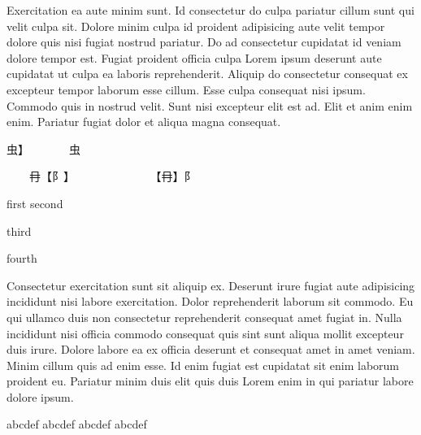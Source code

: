 
Exercitation ea aute minim sunt. Id consectetur do culpa pariatur cillum sunt qui velit culpa sit. Dolore minim culpa id proident adipisicing aute velit tempor dolore quis nisi fugiat nostrud pariatur. Do ad consectetur cupidatat id veniam dolore tempor est. Fugiat proident officia culpa Lorem ipsum deserunt aute cupidatat ut culpa ea laboris reprehenderit. Aliquip do consectetur consequat ex excepteur tempor laborum esse cillum. Esse culpa consequat nisi ipsum. Commodo quis in nostrud velit. Sunt nisi excepteur elit est ad. Elit et anim enim enim. Pariatur fugiat dolor et aliqua magna consequat.



\begingroup\mktsObeyAllLines{}






{虫{\mktsFontfileNanummyeongjo{}】}{\cnsym{}　}{\cnsym{}　}{\cnsym{}　}{\cnsym{}　}虫




{\cnsym{}　}{\cnsym{}　}冄{\mktsFontfileNanummyeongjo{}【}{阝}{\mktsFontfileNanummyeongjo{}】}{\cnsym{}　}{\cnsym{}　}{\cnsym{}　}{\cnsym{}　}{\cnxb{}𨙻}
{\cnsym{}　}{\cnsym{}　}{\cnsym{}　}{\mktsFontfileNanummyeongjo{}【}冄{\mktsFontfileNanummyeongjo{}】}{阝}{\cnsym{}　}{\cnsym{}　}{\cnsym{}　}{\cnxb{}𨙻}}

\endgroup{}

\begingroup\mktsObeyAllLines{}

\begingroup\mktsStyleCode{}
first
second


third




fourth



\endgroup{}{}

\endgroup{}Consectetur exercitation sunt sit aliquip ex. Deserunt irure fugiat aute adipisicing incididunt nisi labore exercitation. Dolor reprehenderit laborum sit commodo. Eu qui ullamco duis non consectetur reprehenderit consequat amet fugiat in. Nulla incididunt nisi officia commodo consequat quis sint sunt aliqua mollit excepteur duis irure. Dolore labore ea ex officia deserunt et consequat amet in amet veniam. Minim cillum quis ad enim esse. Id enim fugiat est cupidatat sit enim laborum proident eu. Pariatur minim duis elit quis duis Lorem enim in qui pariatur labore dolore ipsum.




abc{\mktsFontfileSunexta\color{red}}def
abc{\mktsFontfileSunexta\color{red}}def
abc{\color{red}}def
abcdef



